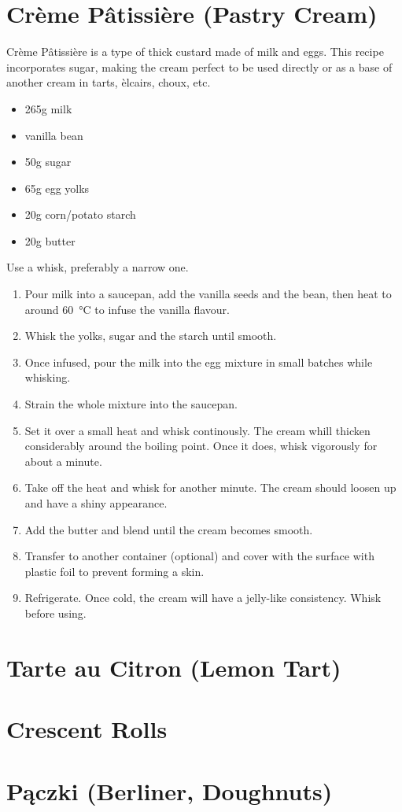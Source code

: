 \section{Crème Pâtissière (Pastry Cream)}
Crème Pâtissière is a type of thick custard made of milk and eggs. This recipe
incorporates sugar, making the cream perfect to be used directly or as a base
of another cream in tarts, èlcairs, choux, etc.

\begin{itemize}
  \item 265g milk
  \item vanilla bean
  \item 50g sugar
  \item 65g egg yolks
  \item 20g corn/potato starch
  \item 20g butter
\end{itemize}

Use a whisk, preferably a narrow one.
\begin{enumerate}
  \item Pour milk into a saucepan, add the vanilla seeds and the bean, then heat
  to around \SI{60}{\celsius} to infuse the vanilla flavour.
  \item Whisk the yolks, sugar and the starch until smooth.
  \item Once infused, pour the milk into the egg mixture in small batches while
  whisking.
  \item Strain the whole mixture into the saucepan.
  \item Set it over a small heat and whisk continously. The cream whill thicken
  considerably around the boiling point. Once it does, whisk vigorously for
  about a minute.
  \item Take off the heat and whisk for another minute. The cream should loosen
  up and have a shiny appearance.
  \item Add the butter and blend until the cream becomes smooth.
  \item Transfer to another container (optional) and cover with the surface with
  plastic foil to prevent forming a skin.
  \item Refrigerate. Once cold, the cream will have a jelly-like consistency.
  Whisk before using.
\end{enumerate}

\section{Tarte au Citron (Lemon Tart)}


\section{Crescent Rolls}

\section{Pączki (Berliner, Doughnuts)}
